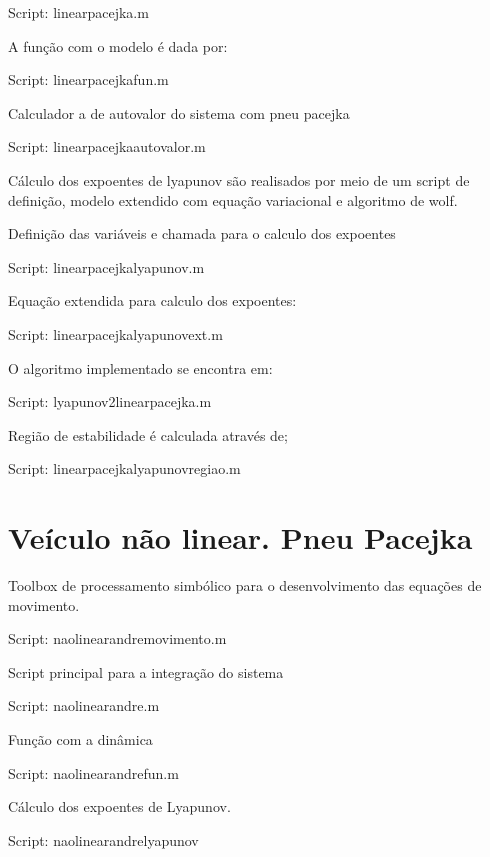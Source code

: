 \documentclass[sublist]{fei}
\begin{document}
	Script: linearpacejka.m

A função com o modelo é dada por:

	Script: linearpacejkafun.m

Calculador a de autovalor do sistema com pneu pacejka

	Script: linearpacejkaautovalor.m

Cálculo dos expoentes de lyapunov são realisados por meio de um script de definição, modelo extendido com equação variacional e algoritmo de wolf.

Definição das variáveis e chamada para o calculo dos expoentes

	Script: linearpacejkalyapunov.m

Equação extendida para calculo dos expoentes:

	Script: linearpacejkalyapunovext.m

O algoritmo implementado se encontra em:

Script: lyapunov2linearpacejka.m

Região de estabilidade é calculada através de;

	Script: linearpacejkalyapunovregiao.m








\chapter{Veículo não linear. Pneu Pacejka} 

Toolbox de processamento simbólico para o desenvolvimento das equações de movimento.

	Script: naolinearandremovimento.m

Script principal para a integração do sistema

	Script: naolinearandre.m

Função com a dinâmica

	Script: naolinearandrefun.m

Cálculo dos expoentes de Lyapunov.

	Script: naolinearandrelyapunov






%
%

\end{document}
